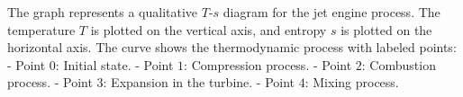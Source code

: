 The graph represents a qualitative \( T \)-\( s \) diagram for the jet engine process. The temperature \( T \) is plotted on the vertical axis, and entropy \( s \) is plotted on the horizontal axis. The curve shows the thermodynamic process with labeled points:  
- Point \( 0 \): Initial state.  
- Point \( 1 \): Compression process.  
- Point \( 2 \): Combustion process.  
- Point \( 3 \): Expansion in the turbine.  
- Point \( 4 \): Mixing process.